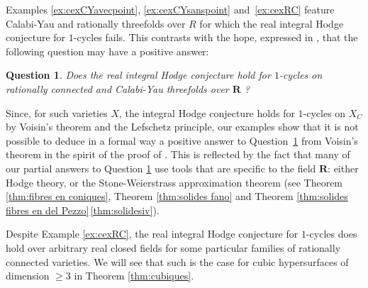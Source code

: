 \documentclass[JEP,XML,SOM,Unicode]{cedram}
\theoremstyle{plain}
\newtheorem{question}[thm]{Question}
\theoremstyle{definition}
\numberwithin{equation}{section}
\newcommand{\R}{{\mathbf R}}
\begin{document}
Examples \ref{ex:cexCYavecpoint}, \ref{ex:cexCYsanspoint} and~\ref{ex:cexRC} feature Calabi-Yau and rationally threefolds over $R$ for which the real integral Hodge conjecture for $1$-cycles fails. This contrasts with the hope, expressed in \cite[Quest.\,\ref*{BW1-mainquestion}]{BW1},
that
the following question may have a positive answer:

\begin{question}
\label{mainquestionpart2}
Does the real integral Hodge conjecture hold for $1$-cycles on rationally connected and Calabi-Yau threefolds over $\R$ ?
\end{question}

Since, for such varieties $X$, the integral Hodge conjecture holds for $1$-cycles on $X_C$ by Voisin's theorem \cite[Th.\,2]{voisinthreefolds} and the Lefschetz principle, our examples show that it is not possible to deduce in a formal way a positive answer to Question~\ref{mainquestionpart2}
from Voisin's theorem in the spirit of the proof of \cite[Prop.\,\ref*{BW1-prop:real(1,1)nonarch}]{BW1}. This is reflected by the fact that many of our partial answers to Question \ref{mainquestionpart2} use tools that are specific to the field $\R$: either Hodge theory, or the Stone-Weierstrass approximation theorem (see Theorem \ref{thm:fibres en coniques}, Theorem \ref{thm:solides fano} and Theorem \ref{thm:solides fibres en del Pezzo}\,\eqref{thm:solidesiv}).

Despite Example \ref{ex:cexRC}, the real integral Hodge conjecture for $1$-cycles does hold over arbitrary real closed fields for some particular families of rationally connected varieties. We will see that such is the case for cubic hypersurfaces of dimension $\geq 3$ in Theorem \ref{thm:cubiques}.
\end{document}
